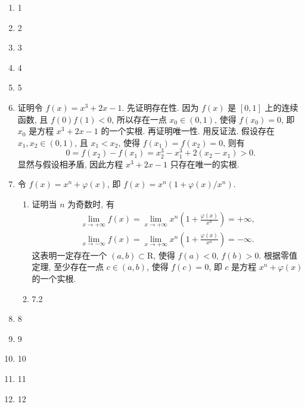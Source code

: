 \documentclass[a4paper, 11pt]{ctexart}
\begin{document}
\pagestyle{empty}
\begin{enumerate}
    \item 1
    \item 2
    \item 3
    \item 4
    \item 5
    \item %
        {\heiti 证明}\quad 令 $f(x) = x^3 + 2x - 1$. 先证明存在性. 因为 $f(x)$ 是 $[0, 1]$ 上的连续函数, 且 $f(0)f(1) < 0$, 所以存在一点 $x_0 \in (0, 1)$, 使得 $f(x_0) = 0$,
        即 $x_0$ 是方程 $x^3 + 2x - 1$ 的一个实根.
        再证明唯一性. 用反证法. 假设存在 $x_1, x_2 \in (0, 1)$, 且 $x_1 < x_2$, 使得 $f(x_1) = f(x_2) = 0$, 则有
        \[
            0 = f(x_2) - f(x_1) = x_2^3 - x_1^3 + 2(x_2 - x_1) > 0.    
        \]
        显然与假设相矛盾, 因此方程 $x^3 + 2x - 1$ 只存在唯一的实根.
    \item %
        令 $f(x) = x^n + \varphi(x)$, 即 $f(x) = x^n(1 + \varphi(x)/x^n)$.
        \begin{enumerate}[(1)]
            \item %
                {\heiti 证明}\quad 当 $n$ 为奇数时, 有
                \begin{gather*}
                    \lim_{x\to+\infty}f(x) = \lim_{x\to+\infty}x^n\left(1 + \frac{\varphi(x)}{x^n}\right) = +\infty, \\
                    \lim_{x\to-\infty}f(x) = \lim_{x\to+\infty}x^n\left(1 + \frac{\varphi(x)}{x^n}\right) = -\infty.
                \end{gather*}
                这表明一定存在一个 $(a, b) \subset \mathrm{R}$, 使得 $f(a) < 0$, $f(b) > 0$. 根据零值定理, 至少存在一点 $c \in (a, b)$, 使得 $f(c) = 0$,
                即 $c$ 是方程 $x^n + \varphi(x)$ 的一个实根.
                        
            \item 7.2
        \end{enumerate}
    \item 8
    \item 9
    \item 10
    \item 11
    \item 12
\end{enumerate}
\end{document}
